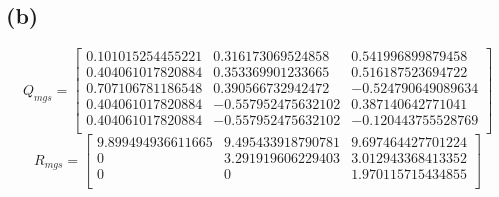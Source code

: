 \documentclass{article}
\begin{document}
        \subsection*{(b)}
            \begin{equation}
                Q_{mgs} = \left[
                \begin{array}{ccc}
                    0.101015254455221 &  0.316173069524858 &  0.541996899879458\\
                    0.404061017820884 &  0.353369901233665 &  0.516187523694722\\
                    0.707106781186548 &  0.390566732942472 & -0.524790649089634\\
                    0.404061017820884 & -0.557952475632102 &  0.387140642771041\\
                    0.404061017820884 & -0.557952475632102 & -0.120443755528769\\
                \end{array}
                \right]
            \end{equation}
            \begin{equation}
                R_{mgs} = \left[    
                \begin{array}{ccc}
                    9.899494936611665 &  9.495433918790781 &  9.697464427701224\\
                    0 &  3.291919606229403 &  3.012943368413352\\
                    0 &                  0 &  1.970115715434855\\
                \end{array}
                \right]
            \end{equation}
\end{document}
